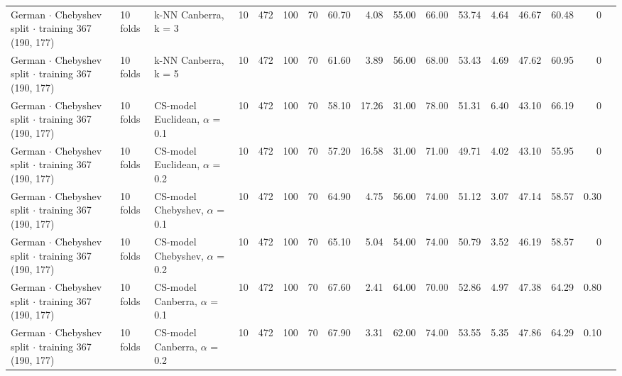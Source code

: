 \begin{longtable}{lllrrrrrrrrrrrrrl}
  German $\cdot$ Chebyshev split $\cdot$ training 367 (190, 177) & 10 folds & k-NN Canberra, k = 3 & 10 & 472 & 100 & 70 & 60.70 & 4.08 & 55.00 & 66.00 & 53.74 & 4.64 & 46.67 & 60.48 & 0 &  \\
  German $\cdot$ Chebyshev split $\cdot$ training 367 (190, 177) & 10 folds & k-NN Canberra, k = 5 & 10 & 472 & 100 & 70 & 61.60 & 3.89 & 56.00 & 68.00 & 53.43 & 4.69 & 47.62 & 60.95 & 0 &  \\
  German $\cdot$ Chebyshev split $\cdot$ training 367 (190, 177) & 10 folds & CS-model Euclidean, $\alpha$ = 0.1 & 10 & 472 & 100 & 70 & 58.10 & 17.26 & 31.00 & 78.00 & 51.31 & 6.40 & 43.10 & 66.19 & 0 &  \\
  German $\cdot$ Chebyshev split $\cdot$ training 367 (190, 177) & 10 folds & CS-model Euclidean, $\alpha$ = 0.2 & 10 & 472 & 100 & 70 & 57.20 & 16.58 & 31.00 & 71.00 & 49.71 & 4.02 & 43.10 & 55.95 & 0 &  \\
  German $\cdot$ Chebyshev split $\cdot$ training 367 (190, 177) & 10 folds & CS-model Chebyshev, $\alpha$ = 0.1 & 10 & 472 & 100 & 70 & 64.90 & 4.75 & 56.00 & 74.00 & 51.12 & 3.07 & 47.14 & 58.57 & 0.30 &  \\
  German $\cdot$ Chebyshev split $\cdot$ training 367 (190, 177) & 10 folds & CS-model Chebyshev, $\alpha$ = 0.2 & 10 & 472 & 100 & 70 & 65.10 & 5.04 & 54.00 & 74.00 & 50.79 & 3.52 & 46.19 & 58.57 & 0 &  \\
  German $\cdot$ Chebyshev split $\cdot$ training 367 (190, 177) & 10 folds & CS-model Canberra, $\alpha$ = 0.1 & 10 & 472 & 100 & 70 & 67.60 & 2.41 & 64.00 & 70.00 & 52.86 & 4.97 & 47.38 & 64.29 & 0.80 &  \\
  German $\cdot$ Chebyshev split $\cdot$ training 367 (190, 177) & 10 folds & CS-model Canberra, $\alpha$ = 0.2 & 10 & 472 & 100 & 70 & 67.90 & 3.31 & 62.00 & 74.00 & 53.55 & 5.35 & 47.86 & 64.29 & 0.10 &  \\
\end{longtable}
